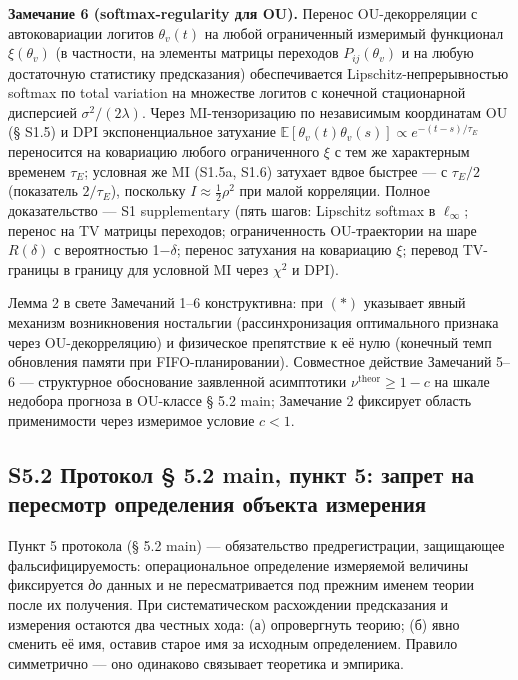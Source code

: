 \documentclass[pdflatex,sn-mathphys-ay]{sn-jnl}
\begin{document}
\textbf{Замечание 6 (softmax-regularity для OU).} Перенос OU-декорреляции с автоковариации логитов \(\theta_v(t)\) на любой ограниченный измеримый функционал \(\xi(\theta_v)\) (в частности, на элементы матрицы переходов \(P_{ij}(\theta_v)\) и на любую достаточную статистику предсказания) обеспечивается Lipschitz-непрерывностью softmax по total variation на множестве логитов с конечной стационарной дисперсией \(\sigma^2/(2\lambda)\). Через MI-тензоризацию по независимым координатам OU (§ S1.5) и DPI экспоненциальное затухание \(\mathbb{E}[\theta_v(t)\theta_v(s)] \propto e^{-(t-s)/\tau_E}\) переносится на ковариацию любого ограниченного \(\xi\) с тем же характерным временем \(\tau_E\); условная же MI (S1.5a, S1.6) затухает вдвое быстрее --- с \(\tau_E/2\) (показатель \(2/\tau_E\)), поскольку \(I \approx \tfrac{1}{2}\rho^2\) при малой корреляции. Полное доказательство --- S1 supplementary (пять шагов: Lipschitz softmax в \(\ell_\infty\); перенос на TV матрицы переходов; ограниченность OU-траектории на шаре \(R(\delta)\) с вероятностью 1\(-\delta\); перенос затухания на ковариацию \(\xi\); перевод TV-границы в границу для условной MI через \(\chi^2\) и DPI).



Лемма 2 в свете Замечаний 1--6 конструктивна: при \((*)\) указывает явный механизм возникновения ностальгии (рассинхронизация оптимального признака через OU-декорреляцию) и физическое препятствие к её нулю (конечный темп обновления памяти при FIFO-планировании). Совместное действие Замечаний 5--6 --- структурное обоснование заявленной асимптотики \(\nu^{\text{theor}} \ge 1 - c\) на шкале недобора прогноза в OU-классе § 5.2 main; Замечание 2 фиксирует область применимости через измеримое условие \(c < 1\).



\subsection*{S5.2 Протокол § 5.2 main, пункт 5: запрет на пересмотр определения объекта измерения}\label{s5.2-ux43fux440ux43eux442ux43eux43aux43eux43b-5.2-main-ux43fux443ux43dux43aux442-5-ux437ux430ux43fux440ux435ux442-ux43dux430-ux43fux435ux440ux435ux441ux43cux43eux442ux440-ux43eux43fux440ux435ux434ux435ux43bux435ux43dux438ux44f-ux43eux431ux44aux435ux43aux442ux430-ux438ux437ux43cux435ux440ux435ux43dux438ux44f}



Пункт 5 протокола (§ 5.2 main) --- обязательство предрегистрации, защищающее фальсифицируемость: операциональное определение измеряемой величины фиксируется \emph{до} данных и не пересматривается под прежним именем теории после их получения. При систематическом расхождении предсказания и измерения остаются два честных хода: (а) опровергнуть теорию; (б) явно сменить её имя, оставив старое имя за исходным определением. Правило симметрично --- оно одинаково связывает теоретика и эмпирика.
\end{document}

